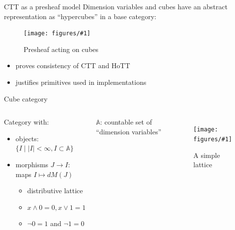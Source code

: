 \documentclass[english,handout]{beamer}
\newcommand{\fig}[2]{
    \begin{figure}\begin{center}\texttt{[image: figures/\#1]}\caption{#2\label{#1}}\end{center}
    \end{figure}}
\begin{document}
\begin{frame}{CTT as a presheaf model}
    Dimension variables and cubes have an abstract representation as ``hypercubes'' in a base category:
    
    \fig{cube_presheaf}{Presheaf acting on cubes}

    \begin{itemize}
        \item proves consistency of CTT and HoTT
        \item justifies primitives used in implementations
    \end{itemize}
    
\end{frame}

\begin{frame}{Cube category}

%  
%  


  \begin{columns}[c]
        
    \begin{definition}
    Category with:
        \begin{itemize}
            \item objects: $\{ I \mid |I| < \infty , I \subset \mathbb{A} \}$
            \item morphisms $J\rightarrow I$: maps $I \mapsto dM(J)$
            \begin{itemize}
                \item distributive lattice
                \item  $x \wedge 0 = 0, x\vee 1 = 1$
                \item $\neg 0 = 1$ and $ \neg 1 =0$
            \end{itemize}
        \end{itemize}
        \end{definition}
$\mathbb{A}$: countable set of ``dimension variables'' 
        \fig{lattice}{A simple lattice}
\end{columns}
 
 
\end{frame}
\end{document}
